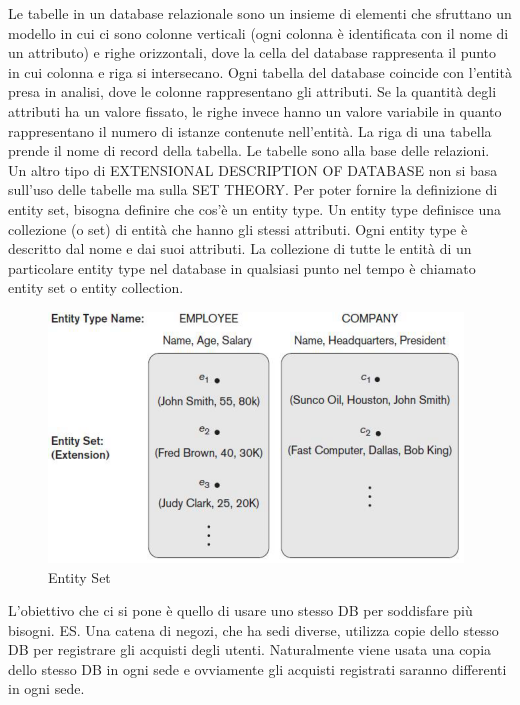 Le tabelle in un database relazionale sono un insieme di elementi che sfruttano un modello in cui ci sono colonne verticali (ogni colonna è identificata con il nome di un attributo) e righe orizzontali, dove la cella del database rappresenta il punto in cui colonna e riga si intersecano. Ogni tabella del database coincide con l’entità presa in analisi, dove le colonne rappresentano gli attributi. Se la quantità degli attributi ha un valore fissato, le righe invece hanno un valore variabile in quanto rappresentano il numero di istanze contenute 
nell’entità. La riga di una tabella prende il nome di record della tabella. Le tabelle sono alla base delle relazioni. 
Un altro tipo di EXTENSIONAL DESCRIPTION OF DATABASE non si basa sull’uso delle tabelle ma sulla SET THEORY. Per poter fornire la definizione di entity set, bisogna definire che cos’è un entity type. Un entity type definisce una collezione (o set) di entità che hanno gli stessi attributi. Ogni entity type è descritto dal nome e dai suoi attributi. La collezione di tutte le entità di un particolare entity type nel database in qualsiasi punto nel tempo è chiamato entity set o entity collection.

\begin{center}
\begin{figure}[H]
\centering
\includegraphics[scale=1]{figures/entity_set.png}
\caption{Entity Set} 
\end{figure}
\end{center}

L’obiettivo che ci si pone è quello di usare uno stesso DB per soddisfare più bisogni.  
ES. Una catena di negozi, che ha sedi diverse, utilizza copie dello stesso DB per registrare gli acquisti degli utenti. Naturalmente viene usata una copia dello stesso DB in ogni sede e ovviamente gli acquisti registrati saranno differenti in ogni sede.

